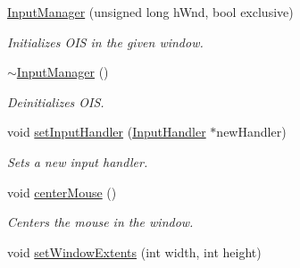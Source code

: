 \begin{DoxyCompactItemize}
\item 
\hypertarget{classInputManager_ad1f5cd1a0344762fdb12b0ca0a9275a0}{
\hyperlink{classInputManager_ad1f5cd1a0344762fdb12b0ca0a9275a0}{\-Input\-Manager} (unsigned long h\-Wnd, bool exclusive)}
\label{d5/d39/classInputManager_ad1f5cd1a0344762fdb12b0ca0a9275a0}

\begin{DoxyCompactList}\small\item\em \-Initializes \-O\-I\-S in the given window. \end{DoxyCompactList}\item 
\hypertarget{classInputManager_af518290877dd183606709d5852db5491}{
\hyperlink{classInputManager_af518290877dd183606709d5852db5491}{$\sim$\-Input\-Manager} ()}
\label{d5/d39/classInputManager_af518290877dd183606709d5852db5491}

\begin{DoxyCompactList}\small\item\em \-Deinitializes \-O\-I\-S. \end{DoxyCompactList}\item 
\hypertarget{classInputManager_a8affb2d7b491b3aee25e9e25180d5c29}{
void \hyperlink{classInputManager_a8affb2d7b491b3aee25e9e25180d5c29}{set\-Input\-Handler} (\hyperlink{classInputHandler}{\-Input\-Handler} $\ast$new\-Handler)}
\label{d5/d39/classInputManager_a8affb2d7b491b3aee25e9e25180d5c29}

\begin{DoxyCompactList}\small\item\em \-Sets a new input handler. \end{DoxyCompactList}\item 
\hypertarget{classInputManager_a43a4691029d25a2e334f383bdf610e18}{
void \hyperlink{classInputManager_a43a4691029d25a2e334f383bdf610e18}{center\-Mouse} ()}
\label{d5/d39/classInputManager_a43a4691029d25a2e334f383bdf610e18}

\begin{DoxyCompactList}\small\item\em \-Centers the mouse in the window. \end{DoxyCompactList}\item 
\hypertarget{classInputManager_a57d2104a82aa83960bd0e888ee03a1a2}{
void \hyperlink{classInputManager_a57d2104a82aa83960bd0e888ee03a1a2}{set\-Window\-Extents} (int width, int height)}
\label{d5/d39/classInputManager_a57d2104a82aa83960bd0e888ee03a1a2}


\end{DoxyCompactItemize}
